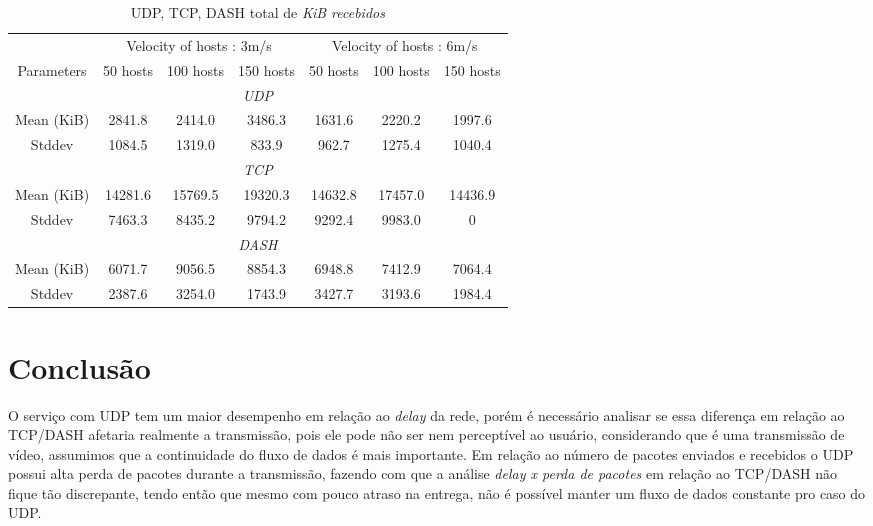 \documentclass[12pt]{article}
\begin{document}
\begin{table}[h!] 
  \centering
  \caption{UDP, TCP, DASH total de \textit{KiB recebidos}}
  \begin{tabular}{c|ccc|ccc}
    \hline
    \multicolumn{1}{c}{} & \multicolumn{3}{c}{Velocity of hosts : 3m/s} & \multicolumn{3}{c}{Velocity of hosts : 6m/s} 			\\ 
    Parameters             & 50 hosts      & 100 hosts     & 150 hosts     &   50 hosts      & 100 hosts     & 150 hosts     		\\ 
    \hline
    \hline
    \multicolumn{7}{c}{\textit{UDP}} \\
    \hline
    \hline
    Mean (KiB) & 2841.8    & 2414.0   & 3486.3    & 1631.6  & 2220.2    &  1997.6  \\
    Stddev       & 1084.5   & 1319.0   & 833.9   & 962.7  & 1275.4    &  1040.4  \\
    \hline
    \hline
    \multicolumn{7}{c}{\textit{TCP}} \\
    \hline
    \hline
    Mean (KiB) & 14281.6    & 15769.5   & 19320.3    &  	14632.8 & 17457.0    &  14436.9  \\
    Stddev       & 7463.3   & 8435.2   & 9794.2   & 9292.4  & 9983.0    &  0  \\
    \hline
    \hline
    \multicolumn{7}{c}{\textit{DASH}} \\
    \hline
    \hline
    Mean (KiB) &  	6071.7   &  	9056.5   & 8854.3    &  	6948.8 & 7412.9    &  7064.4  \\
    Stddev       & 2387.6   & 3254.0   & 1743.9  & 3427.7  & 3193.6    &  1984.4 \\
    \hline
  \end{tabular}
  \label{tab:tabletotal}
\end{table}
\FloatBarrier



\section{Conclusão}

	O serviço com UDP tem um maior desempenho em relação ao \textit{delay} da rede, porém é necessário analisar se essa diferença em relação ao TCP/DASH afetaria realmente a transmissão, pois ele pode não ser nem perceptível ao usuário, considerando que é uma transmissão de vídeo, assumimos que a continuidade do fluxo de dados é mais importante. Em relação ao número de pacotes enviados e recebidos o UDP possui alta perda de pacotes durante a transmissão, fazendo com que a análise \textit{delay x perda de pacotes} em relação ao TCP/DASH não fique tão discrepante, tendo então que mesmo com pouco atraso na entrega, não é possível manter um fluxo de dados constante pro caso do UDP.
    
\end{document}
